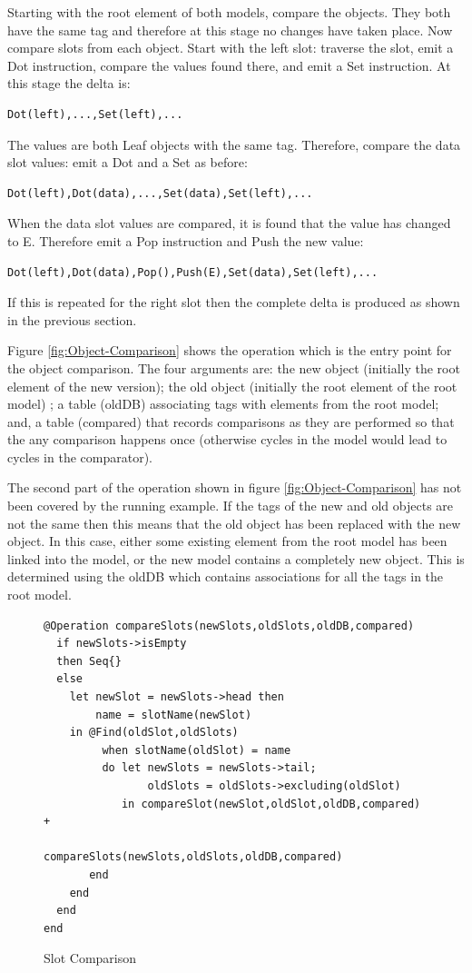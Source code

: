 Starting with the root element of both models, compare the objects.
They both have the same tag and therefore at this stage no changes
have taken place. Now compare slots from each object. Start with the
left slot: traverse the slot, emit a Dot instruction, compare the
values found there, and emit a Set instruction. At this stage the
delta is:

\begin{lstlisting}
Dot(left),...,Set(left),...
\end{lstlisting}The values are both Leaf objects with the same tag. Therefore, compare
the data slot values: emit a Dot and a Set as before:

\begin{lstlisting}
Dot(left),Dot(data),...,Set(data),Set(left),...
\end{lstlisting}When the data slot values are compared, it is found that the value
has changed to E. Therefore emit a Pop instruction and Push the new
value:

\begin{lstlisting}
Dot(left),Dot(data),Pop(),Push(E),Set(data),Set(left),...
\end{lstlisting}If this is repeated for the right slot then the complete delta is
produced as shown in the previous section.

Figure \ref{fig:Object-Comparison} shows the operation which is the
entry point for the object comparison. The four arguments are: the
new object (initially the root element of the new version); the old
object (initially the root element of the root model) ; a table (oldDB)
associating tags with elements from the root model; and, a table (compared)
that records comparisons as they are performed so that the any comparison
happens once (otherwise cycles in the model would lead to cycles in
the comparator).

The second part of the operation shown in figure \ref{fig:Object-Comparison}
has not been covered by the running example. If the tags of the new
and old objects are not the same then this means that the old object
has been replaced with the new object. In this case, either some existing
element from the root model has been linked into the model, or the
new model contains a completely new object. This is determined using
the oldDB which contains associations for all the tags in the root
model.

%
\begin{figure}
\hfill{}\begin{lstlisting}
@Operation compareSlots(newSlots,oldSlots,oldDB,compared)
  if newSlots->isEmpty
  then Seq{}
  else
    let newSlot = newSlots->head then
        name = slotName(newSlot)
    in @Find(oldSlot,oldSlots)
         when slotName(oldSlot) = name
         do let newSlots = newSlots->tail;
                oldSlots = oldSlots->excluding(oldSlot)
            in compareSlot(newSlot,oldSlot,oldDB,compared) +
               compareSlots(newSlots,oldSlots,oldDB,compared)
       end
    end
  end
end
\end{lstlisting}\hfill{}

\caption{Slot Comparison\label{fig:Slot-Comparison}}

\end{figure}


